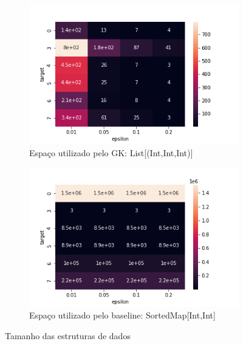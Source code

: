 \documentclass[11pt]{article}
\begin{document}
\begin{figure}[ht]
\begin{subfigure}{.5\textwidth}
  \centering
  \includegraphics[width=.9\linewidth]{../../img/QUANTIL_heatmap_TAMANHO.png}
  \caption{Espaço utilizado pelo \newline GK: List[(Int,Int,Int)]}
  \label{fig:sub-first}
\end{subfigure}
\begin{subfigure}{.5\textwidth}
  \centering
  \includegraphics[width=.9\linewidth]{../../img/QUANTIL_heatmap_TAMANHO_BASELINE.png}
  \caption{Espaço utilizado pelo \newline baseline: SortedMap[Int,Int]}
\end{subfigure}
\caption{Tamanho das estruturas de dados}
\end{figure}
\end{document}
